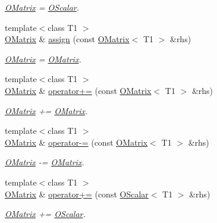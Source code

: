 \begin{DoxyCompactItemize}
\begin{DoxyCompactList}\small\item\em \mbox{\hyperlink{classENSEM_1_1OMatrix}{O\+Matrix}} = \mbox{\hyperlink{classENSEM_1_1OScalar}{O\+Scalar}}. \end{DoxyCompactList}\item 
{\footnotesize template$<$class T1 $>$ }\\\mbox{\hyperlink{classENSEM_1_1OMatrix}{O\+Matrix}} \& \mbox{\hyperlink{classENSEM_1_1OMatrix_a37ed216c9ecfe42f7a357573699b3bfc}{assign}} (const \mbox{\hyperlink{classENSEM_1_1OMatrix}{O\+Matrix}}$<$ T1 $>$ \&rhs)
\begin{DoxyCompactList}\small\item\em \mbox{\hyperlink{classENSEM_1_1OMatrix}{O\+Matrix}} = \mbox{\hyperlink{classENSEM_1_1OMatrix}{O\+Matrix}}. \end{DoxyCompactList}\item 
{\footnotesize template$<$class T1 $>$ }\\\mbox{\hyperlink{classENSEM_1_1OMatrix}{O\+Matrix}} \& \mbox{\hyperlink{classENSEM_1_1OMatrix_a221eb5f9e17402ad93c829fcaf2ac60a}{operator+=}} (const \mbox{\hyperlink{classENSEM_1_1OMatrix}{O\+Matrix}}$<$ T1 $>$ \&rhs)
\begin{DoxyCompactList}\small\item\em \mbox{\hyperlink{classENSEM_1_1OMatrix}{O\+Matrix}} += \mbox{\hyperlink{classENSEM_1_1OMatrix}{O\+Matrix}}. \end{DoxyCompactList}\item 
{\footnotesize template$<$class T1 $>$ }\\\mbox{\hyperlink{classENSEM_1_1OMatrix}{O\+Matrix}} \& \mbox{\hyperlink{classENSEM_1_1OMatrix_a4c9bcdd861f4439d1b165ec5285cf55f}{operator-\/=}} (const \mbox{\hyperlink{classENSEM_1_1OMatrix}{O\+Matrix}}$<$ T1 $>$ \&rhs)
\begin{DoxyCompactList}\small\item\em \mbox{\hyperlink{classENSEM_1_1OMatrix}{O\+Matrix}} -\/= \mbox{\hyperlink{classENSEM_1_1OMatrix}{O\+Matrix}}. \end{DoxyCompactList}\item 
{\footnotesize template$<$class T1 $>$ }\\\mbox{\hyperlink{classENSEM_1_1OMatrix}{O\+Matrix}} \& \mbox{\hyperlink{classENSEM_1_1OMatrix_ab488697fd72f3891fede3d00f8deb019}{operator+=}} (const \mbox{\hyperlink{classENSEM_1_1OScalar}{O\+Scalar}}$<$ T1 $>$ \&rhs)
\begin{DoxyCompactList}\small\item\em \mbox{\hyperlink{classENSEM_1_1OMatrix}{O\+Matrix}} += \mbox{\hyperlink{classENSEM_1_1OScalar}{O\+Scalar}}. \end{DoxyCompactList}\item 

\end{DoxyCompactItemize}
